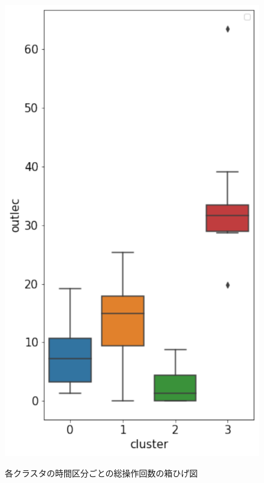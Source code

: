 \documentclass[a4paper,12pt]{ltjsreport}
\begin{document}
\begin{figure}[tbp]
\begin{minipage}[b]{0.32\linewidth}
    \includegraphics[keepaspectratio, scale=0.35]{outlec.pdf}
    \label{fig:outlec}
  \end{minipage}
  \caption{各クラスタの時間区分ごとの総操作回数の箱ひげ図}
  \label{fig:cluster}
\end{figure}





\end{document}
